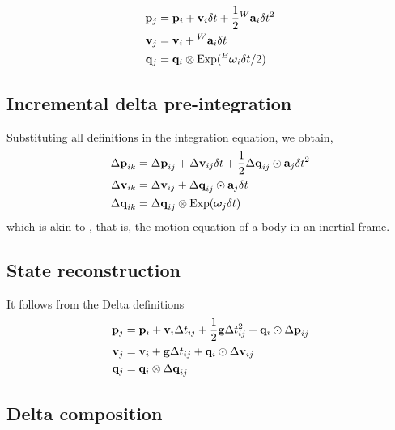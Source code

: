 \begin{align}\label{equ:g_second_order_integration}
\begin{split}
{\bf p}_{j} &= {\bf p}_i + {\bf v}_i\delta t  + \frac12{}^W{\bf a}_i\delta t^2 \\
{\bf v}_{j} &= {\bf v}_i + {}^W{\bf a}_i\delta t \\
{\bf q}_{j} &= {\bf q}_i\otimes\operatorname*{Exp}({}^B{{\bm \omega}}_i\delta t/2) 
\end{split}
\end{align}



\subsection{Incremental delta pre-integration}
%
Substituting all definitions in the integration equation, we obtain,
%
\begin{align}\label{equ:g_second_order_pre-integration}
\begin{split}
{\Delta{\bf p}}_{ik} 
&= {\Delta{\bf p}}_{ij} + {\Delta{\bf v}}_{ij}\delta t + \frac12{\Delta{\bf q}}_{ij}\odot{\bf a}_j\delta t^2 \\
{\Delta{\bf v}}_{ik} 
&= {\Delta{\bf v}}_{ij} + {\Delta{\bf q}}_{ij}\odot{\bf a}_j\delta t \\
{\Delta{\bf q}}_{ik} 
&= {\Delta{\bf q}}_{ij}\otimes\operatorname*{Exp}({{\bm \omega}}_j\delta t) 
\end{split}
\end{align}
%
which is akin to , that is, the motion equation of a body in an inertial frame.



\subsection{State reconstruction}

It follows from the Delta definitions
%
\begin{align}
\begin{split}
{\bf p}_j &= {\bf p}_i + {\bf v}_i\Delta t_{ij} + \frac12{\bf g}\Delta t_{ij}^2 + {\bf q}_i\odot{\Delta{\bf p}}_{ij} \\
{\bf v}_j &= {\bf v}_i + {\bf g}\Delta t_{ij} + {\bf q}_i\odot{\Delta{\bf v}}_{ij} \\
{\bf q}_j &= {\bf q}_i\otimes{\Delta{\bf q}}_{ij}   
\end{split}
\end{align}

\subsection{Delta composition}

